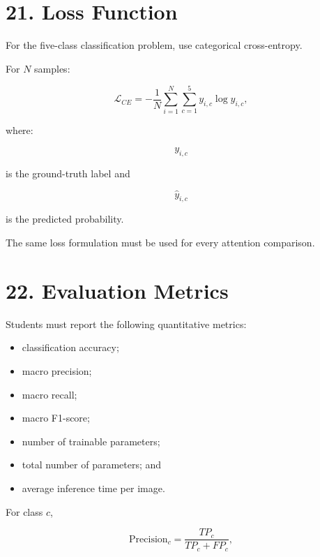 \documentclass[10pt]{article}
\begin{document}
\section*{21. Loss Function}

For the five-class classification problem, use categorical cross-entropy.

For $N$ samples:

\[
\mathcal{L}_{CE}
=
-
\frac{1}{N}
\sum_{i=1}^{N}
\sum_{c=1}^{5}
y_{i,c}
\log
\widehat{y}_{i,c},
\]

where:

\[
y_{i,c}
\]

is the ground-truth label and

\[
\widehat{y}_{i,c}
\]

is the predicted probability.

The same loss formulation must be used for every attention comparison.

\section*{22. Evaluation Metrics}

Students must report the following quantitative metrics:

\begin{itemize}

\item classification accuracy;

\item macro precision;

\item macro recall;

\item macro F1-score;

\item number of trainable parameters;

\item total number of parameters; and

\item average inference time per image.

\end{itemize}

For class $c$,

\[
\mathrm{Precision}_c
=
\frac{TP_c}
{TP_c+FP_c},
\]
\end{document}
